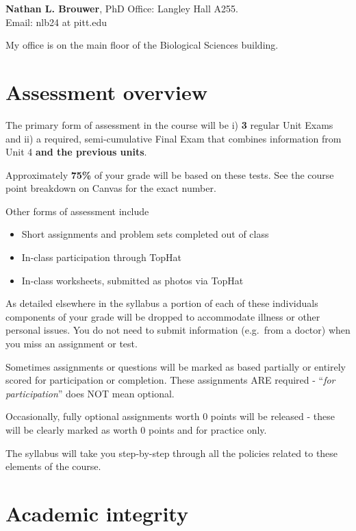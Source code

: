 \documentclass[
]{book}
\providecommand{\tightlist}{%
  \setlength{\itemsep}{0pt}\setlength{\parskip}{0pt}}
\begin{document}
\textbf{Nathan L. Brouwer}, PhD
Office: Langley Hall A255.\\
Email: nlb24 at pitt.edu

My office is on the main floor of the Biological Sciences building.

\hypertarget{assessment-overview}{%
\chapter{Assessment overview}\label{assessment-overview}}

The primary form of assessment in the course will be i) \textbf{3} regular Unit Exams and ii) a required, semi-cumulative Final Exam that combines information from Unit 4 \textbf{and the previous units}.

Approximately \textbf{75\%} of your grade will be based on these tests. See the course point breakdown on Canvas for the exact number.

Other forms of assessment include

\begin{itemize}
\tightlist
\item
  Short assignments and problem sets completed out of class
\item
  In-class participation through TopHat
\item
  In-class worksheets, submitted as photos via TopHat
\end{itemize}

As detailed elsewhere in the syllabus a portion of each of these individuals components of your grade will be dropped to accommodate illness or other personal issues. You do not need to submit information (e.g.~from a doctor) when you miss an assignment or test.

Sometimes assignments or questions will be marked as based partially or entirely scored for participation or completion. These assignments ARE required - ``\emph{for participation}'' does NOT mean optional.

Occasionally, fully optional assignments worth 0 points will be released - these will be clearly marked as worth 0 points and for practice only.

The syllabus will take you step-by-step through all the policies related to these elements of the course.

\hypertarget{academic-integrity}{%
\chapter{Academic integrity}\label{academic-integrity}}
\end{document}
